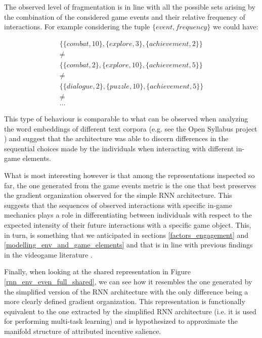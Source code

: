 The observed level of fragmentation is in line with all the possible sets arising by the combination of the considered game events and their relative frequency of interactions. For example considering the tuple $\{event, frequency\}$ we could have:

\begin{gather}
\label{seq_differences}
    \{\{combat, 10\}, \{explore, 3\}, \{achievement, 2\}\} \\ \nonumber
    \neq \\ \nonumber
    \{\{combat, 2\}, \{explore, 10\}, \{achievement, 5\}\} \\ \nonumber
    \neq \\ \nonumber
    \{\{dialogue, 2\}, \{puzzle, 10\}, \{achievement, 5\}\} \\ \nonumber 
    \neq \\ \nonumber
    \dots
\end{gather}

This type of behaviour is comparable to what can be observed when analyzing the word embeddings of different text corpora (e.g. see the Open Syllabus project \cite{opensyllabus}) and suggest that the architecture was able to discern differences in the sequential choices made by the individuals when interacting with different in-game elements.

What is most interesting however is that among the representations inspected so far, the one generated from the game events metric is the one that best preserves the gradient organization observed for the simple RNN architecture. This suggests that the sequences of observed interactions with specific in-game mechanics plays a role in differentiating between individuals with respect to the expected intensity of their future interactions with a specific game object. This, in turn, is something that we anticipated in sections \ref{factors_engagement} and \ref{modelling_env_and_game_elements} and that is in line with previous findings in the videogame literature \cite{makarovych2018like}.

Finally, when looking at the shared representation in Figure \ref{rnn_env_even_full_shared}, we can see how it resembles the one generated by the simplified version of the RNN architecture with the only difference being a more clearly defined gradient organization. This representation is functionally equivalent to the one extracted by the simplified RNN architecture (i.e. it is used for performing multi-task learning) and is hypothesized to approximate the manifold structure of attributed incentive salience.

